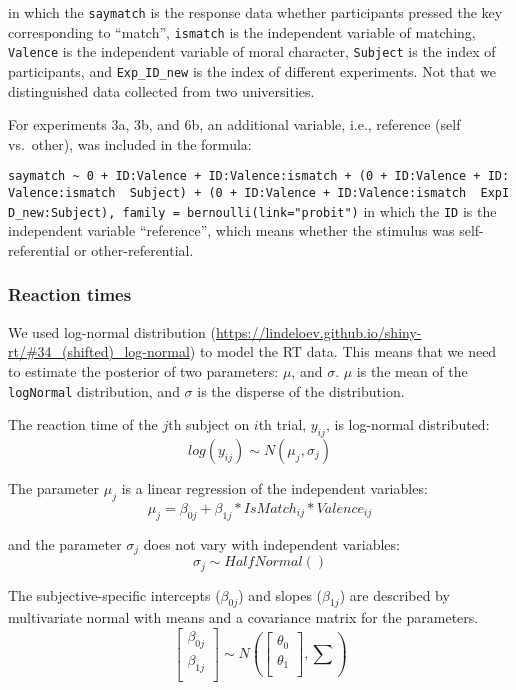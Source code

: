 \documentclass[
  man]{apa6}
\begin{document}
in which the \texttt{saymatch} is the response data whether participants pressed the key corresponding to ``match'', \texttt{ismatch} is the independent variable of matching, \texttt{Valence} is the independent variable of moral character, \texttt{Subject} is the index of participants, and \texttt{Exp\_ID\_new} is the index of different experiments. Not that we distinguished data collected from two universities.

For experiments 3a, 3b, and 6b, an additional variable, i.e., reference (self vs.~other), was included in the formula:

\texttt{saymatch\ \textasciitilde{}\ 0\ +\ ID:Valence\ +\ ID:Valence:ismatch\ +\ (0\ +\ ID:Valence\ +\ ID:Valence:ismatch\ \textbar{}\ Subject)\ +\ (0\ +\ ID:Valence\ +\ ID:Valence:ismatch\ \textbar{}\ ExpID\_new:Subject),\ family\ =\ bernoulli(link="probit")}
in which the \texttt{ID} is the independent variable ``reference'', which means whether the stimulus was self-referential or other-referential.

\hypertarget{reaction-times}{%
\subsubsection{Reaction times}\label{reaction-times}}

We used log-normal distribution (\url{https://lindeloev.github.io/shiny-rt/\#34_(shifted)_log-normal}) to model the RT data. This means that we need to estimate the posterior of two parameters: \(\mu\), and \(\sigma\). \(\mu\) is the mean of the \texttt{logNormal} distribution, and \(\sigma\) is the disperse of the distribution.

The reaction time of the \(j\)th subject on \(i\)th trial, \(y_{ij}\), is log-normal distributed:
\[ log(y_{ij}) \sim N(\mu_{j}, \sigma_{j})\]

The parameter \(\mu_{j}\) is a linear regression of the independent variables:
\[\mu_{j} = \beta_{0j} + \beta_{1j}*IsMatch_{ij} * Valence_{ij}\]

and the parameter \(\sigma_{j}\) does not vary with independent variables:
\[\sigma_{j} \sim HalfNormal()\]

The subjective-specific intercepts (\(\beta_{0j}\)) and slopes (\(\beta_{1j}\)) are described by multivariate normal with means and a covariance matrix for the parameters.
\[ \begin{bmatrix}\beta_{0j}\\
\beta_{1j}\\
\end{bmatrix} \sim N(\begin{bmatrix}\theta_{0}\\
\theta_{1}\\
\end{bmatrix}, \sum) \]
\end{document}
